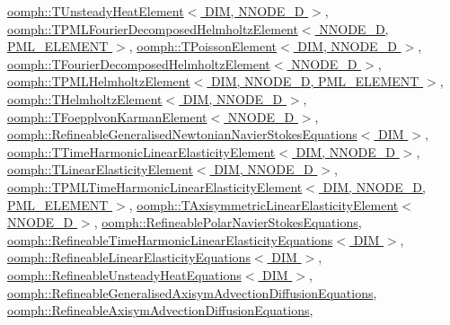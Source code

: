 \hyperlink{classoomph_1_1TUnsteadyHeatElement_a864e7ce7dae3e1db65650970d890273d}{oomph\+::\+T\+Unsteady\+Heat\+Element$<$ D\+I\+M, N\+N\+O\+D\+E\+\_\+D $>$}, \hyperlink{classoomph_1_1TPMLFourierDecomposedHelmholtzElement_a51c4dd153b88d0854da83b9c83f96f26}{oomph\+::\+T\+P\+M\+L\+Fourier\+Decomposed\+Helmholtz\+Element$<$ N\+N\+O\+D\+E\+\_\+D, P\+M\+L\+\_\+\+E\+L\+E\+M\+E\+N\+T $>$}, \hyperlink{classoomph_1_1TPoissonElement_a73f3da4bd164baf56515f2244769a199}{oomph\+::\+T\+Poisson\+Element$<$ D\+I\+M, N\+N\+O\+D\+E\+\_\+D $>$}, \hyperlink{classoomph_1_1TFourierDecomposedHelmholtzElement_aba47a0cfee28a78ac416a49c91e6262a}{oomph\+::\+T\+Fourier\+Decomposed\+Helmholtz\+Element$<$ N\+N\+O\+D\+E\+\_\+D $>$}, \hyperlink{classoomph_1_1TPMLHelmholtzElement_acbab5e3abc283ce69dda34f9a039f60f}{oomph\+::\+T\+P\+M\+L\+Helmholtz\+Element$<$ D\+I\+M, N\+N\+O\+D\+E\+\_\+D, P\+M\+L\+\_\+\+E\+L\+E\+M\+E\+N\+T $>$}, \hyperlink{classoomph_1_1THelmholtzElement_aebf54233a62ec5bea9666aeafce72647}{oomph\+::\+T\+Helmholtz\+Element$<$ D\+I\+M, N\+N\+O\+D\+E\+\_\+D $>$}, \hyperlink{classoomph_1_1TFoepplvonKarmanElement_a9ffd9e45449f8e542a3137ee73b56b5b}{oomph\+::\+T\+Foepplvon\+Karman\+Element$<$ N\+N\+O\+D\+E\+\_\+D $>$}, \hyperlink{classoomph_1_1RefineableGeneralisedNewtonianNavierStokesEquations_afed7aa29e3771db16a3f57a1eae2dbb2}{oomph\+::\+Refineable\+Generalised\+Newtonian\+Navier\+Stokes\+Equations$<$ D\+I\+M $>$}, \hyperlink{classoomph_1_1TTimeHarmonicLinearElasticityElement_a5cce049fe8015dc639df9b028a6b187e}{oomph\+::\+T\+Time\+Harmonic\+Linear\+Elasticity\+Element$<$ D\+I\+M, N\+N\+O\+D\+E\+\_\+D $>$}, \hyperlink{classoomph_1_1TLinearElasticityElement_a1d2268113e23f9b46ee2ce1c18d836de}{oomph\+::\+T\+Linear\+Elasticity\+Element$<$ D\+I\+M, N\+N\+O\+D\+E\+\_\+D $>$}, \hyperlink{classoomph_1_1TPMLTimeHarmonicLinearElasticityElement_ac7cb9f7b5a5194e5f27df25fa2c6fb50}{oomph\+::\+T\+P\+M\+L\+Time\+Harmonic\+Linear\+Elasticity\+Element$<$ D\+I\+M, N\+N\+O\+D\+E\+\_\+D, P\+M\+L\+\_\+\+E\+L\+E\+M\+E\+N\+T $>$}, \hyperlink{classoomph_1_1TAxisymmetricLinearElasticityElement_a8badf4a8ed47cc64b0a728baec1c243a}{oomph\+::\+T\+Axisymmetric\+Linear\+Elasticity\+Element$<$ N\+N\+O\+D\+E\+\_\+D $>$}, \hyperlink{classoomph_1_1RefineablePolarNavierStokesEquations_a44c3c20fb5ac6268dfd7671d83695308}{oomph\+::\+Refineable\+Polar\+Navier\+Stokes\+Equations}, \hyperlink{classoomph_1_1RefineableTimeHarmonicLinearElasticityEquations_a777cc2db7dc159933afddc073b5f6434}{oomph\+::\+Refineable\+Time\+Harmonic\+Linear\+Elasticity\+Equations$<$ D\+I\+M $>$}, \hyperlink{classoomph_1_1RefineableLinearElasticityEquations_a6f5a39ae1cdb8be2aeb6176cc093bfed}{oomph\+::\+Refineable\+Linear\+Elasticity\+Equations$<$ D\+I\+M $>$}, \hyperlink{classoomph_1_1RefineableUnsteadyHeatEquations_acb105ac90a3d3f5c2887f3073db8782b}{oomph\+::\+Refineable\+Unsteady\+Heat\+Equations$<$ D\+I\+M $>$}, \hyperlink{classoomph_1_1RefineableGeneralisedAxisymAdvectionDiffusionEquations_afde683f233636a412fea9793d5be89b3}{oomph\+::\+Refineable\+Generalised\+Axisym\+Advection\+Diffusion\+Equations}, \hyperlink{classoomph_1_1RefineableAxisymAdvectionDiffusionEquations_aaa412c73dd6158738d91c8a2f52df96e}{oomph\+::\+Refineable\+Axisym\+Advection\+Diffusion\+Equations}, 